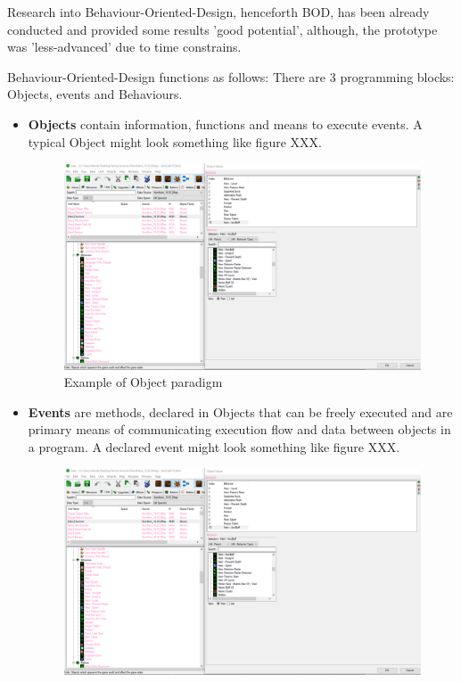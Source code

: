 \documentclass{article}
\begin{document}
Research into Behaviour-Oriented-Design, henceforth BOD, \cite{d2857949266349429ebd6e5db6c1d3a3} has been already conducted and provided some results 'good potential', although, the prototype was 'less-advanced' due to time constrains.

Behaviour-Oriented-Design functions as follows:
There are 3 programming blocks: Objects, events and Behaviours.
\begin{itemize}
    \item \textbf{Objects} contain information, functions and means to execute events. A typical Object might look something like figure XXX.
    \begin{figure}[H]
        \centering
        \includegraphics[width=1\textwidth]{galaxy_behaviours.PNG}
        \caption{Example of Object paradigm}
        \label{fig:bodobj}
    \end{figure}
    \item \textbf{Events} are methods, declared in Objects that can be freely executed and are primary means of communicating execution flow and data between objects in a program. A declared event might look something like figure XXX.
    \begin{figure}[H]
        \centering
        \includegraphics[width=1\textwidth]{galaxy_behaviours.PNG}

\end{figure}
\end{itemize}
\end{document}
